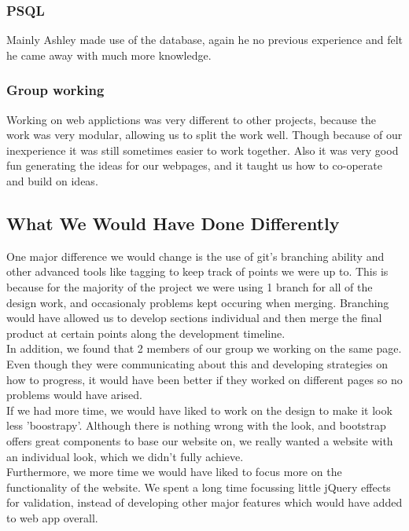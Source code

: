 \documentclass{article}
\begin{document}
  \subsubsection{PSQL}
  Mainly Ashley made use of the database, again he no previous experience and felt he came away with much more knowledge.
  \subsubsection{Group working}
  Working on web applictions was very different to other projects, because the work was very modular, allowing us to split the work well. Though because of our inexperience it was still sometimes easier to work together. Also it was very good fun generating the ideas for our webpages, and it taught us how to co-operate and build on ideas.
\subsection{What We Would Have Done Differently}
One major difference we would change is the use of git's branching ability and other advanced tools like tagging to keep track of points we were up to. This is because for the majority of the project we were using 1 branch for all of the design work, and occasionaly problems kept occuring when merging. Branching would have allowed us to develop sections individual and then merge the final product at certain points along the development timeline. \\
In addition, we found that 2 members of 
our group we working on the same page. Even though they were communicating about this and developing strategies on how to progress, it would have been better if they worked on different pages so no problems would have arised.\\
If we had more time, we would have liked to work on the design to make it look less 'boostrapy'. Although there is nothing wrong with the look, and bootstrap offers great components to base our website on, we really wanted a website with an individual look, which we didn't fully achieve.\\
Furthermore, we more time we would have liked to focus more on the functionality of the website. We spent a long time focussing little jQuery effects for validation, instead of developing other major features which would have added to web app overall.
\end{document}
